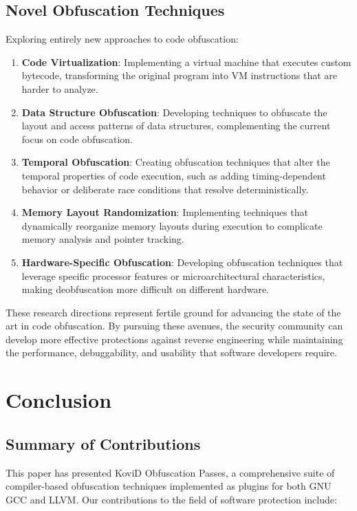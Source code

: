 \documentclass[conference]{IEEEtran}
\begin{document}
\subsection{Novel Obfuscation Techniques}

Exploring entirely new approaches to code obfuscation:

\begin{enumerate}
    \item \textbf{Code Virtualization}: Implementing a virtual machine that executes custom bytecode, transforming the original program into VM instructions that are harder to analyze.
    
    \item \textbf{Data Structure Obfuscation}: Developing techniques to obfuscate the layout and access patterns of data structures, complementing the current focus on code obfuscation.
    
    \item \textbf{Temporal Obfuscation}: Creating obfuscation techniques that alter the temporal properties of code execution, such as adding timing-dependent behavior or deliberate race conditions that resolve deterministically.
    
    \item \textbf{Memory Layout Randomization}: Implementing techniques that dynamically reorganize memory layouts during execution to complicate memory analysis and pointer tracking.
    
    \item \textbf{Hardware-Specific Obfuscation}: Developing obfuscation techniques that leverage specific processor features or microarchitectural characteristics, making deobfuscation more difficult on different hardware.
\end{enumerate}

These research directions represent fertile ground for advancing the state of the art in code obfuscation. By pursuing these avenues, the security community can develop more effective protections against reverse engineering while maintaining the performance, debuggability, and usability that software developers require.

\section{Conclusion}

\subsection{Summary of Contributions}
This paper has presented KoviD Obfuscation Passes, a comprehensive suite of compiler-based obfuscation techniques implemented as plugins for both GNU GCC and LLVM. Our contributions to the field of software protection include:
\end{document}
